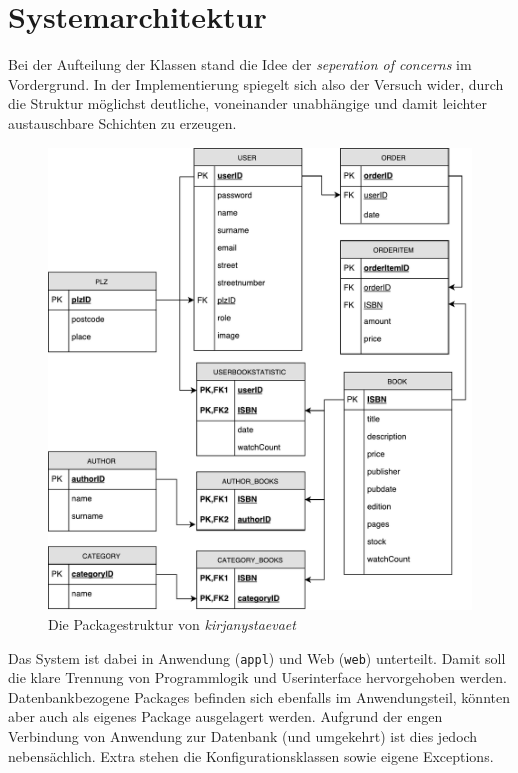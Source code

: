 \section{Systemarchitektur}

Bei der Aufteilung der Klassen stand die Idee der \textit{seperation of concerns} im Vordergrund. In der Implementierung spiegelt sich also der Versuch wider, durch die Struktur möglichst deutliche, voneinander unabhängige und damit leichter austauschbare Schichten zu erzeugen.

\begin{figure}[h]
	\centering
	\includegraphics[width=\linewidth]{files/db-schema}
	\caption{Die Packagestruktur von \textit{kirjanystaevaet}}
	\label{fig:packages}
\end{figure}

Das System ist dabei in Anwendung (\lstinline|appl|) und Web (\lstinline|web|) unterteilt. Damit soll die klare Trennung von Programmlogik und Userinterface hervorgehoben werden. Datenbankbezogene Packages befinden sich ebenfalls im Anwendungsteil, könnten aber auch als eigenes Package ausgelagert werden. Aufgrund der engen Verbindung von Anwendung zur Datenbank (und umgekehrt) ist dies jedoch nebensächlich. Extra stehen die Konfigurationsklassen sowie eigene Exceptions.

